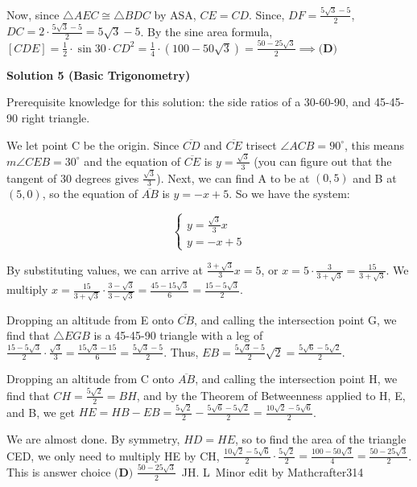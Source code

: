 \begin{enumerate}
 Now, since $\triangle AEC\cong \triangle BDC$ by ASA, $CE=CD$. Since, $DF=\frac{5\sqrt{3}-5}{2}$, $DC=2\cdot \frac{5\sqrt{3}-5}{2}=5\sqrt{3}-5$. By the sine area formula, $[CDE]=\frac{1}{2}\cdot \sin 30\cdot CD^2=\frac{1}{4}\cdot (100-50\sqrt{3})=\frac{50-25\sqrt{3}}{2}\implies \boxed{\textbf{(D)}}$




\textbf{Solution 5 (Basic Trigonometry)}

Prerequisite knowledge for this solution: the side ratios of a 30-60-90, and 45-45-90 right triangle.

 
We let point C be the origin. Since $\overline{CD}$ and $\overline{CE}$ trisect $\angle ACB = 90^{\circ}$, this means $m\angle CEB = 30^{\circ}$ and the equation of $\overline{CE}$ is $y=\frac{\sqrt{3}}{3}$ (you can figure out that the tangent of 30 degrees gives $\frac{\sqrt{3}}{3}$). Next, we can find A to be at $(0, 5)$ and B at $(5, 0)$, so the equation of $\overline{AB}$ is $y=-x+5$. So we have the system:

 
 \[\begin{cases}y=\frac{\sqrt{3}}{3}x\\y=-x+5\end{cases}\]

 By substituting values, we can arrive at $\frac{3+\sqrt{3}}{3}x=5$, or $x=5\cdot\frac{3}{3+\sqrt{3}}=\frac{15}{3+\sqrt{3}}$. We multiply $x=\frac{15}{3+\sqrt{3}}\cdot\frac{3-\sqrt{3}}{3-\sqrt{3}}=\frac{45-15\sqrt{3}}{6}=\frac{15-5\sqrt{3}}{2}$.

 Dropping an altitude from E onto $\overline{CB}$, and calling the intersection point G, we find that $\triangle EGB$ is a 45-45-90 triangle with a leg of $\frac{15-5\sqrt{3}}{2}\cdot\frac{\sqrt{3}}{3}=\frac{15\sqrt{3}-15}{6}=\frac{5\sqrt{3}-5}{2}$. Thus, $EB=\frac{5\sqrt{3}-5}{2}\sqrt{2}=\frac{5\sqrt{6}-5\sqrt{2}}{2}$.

 Dropping an altitude from C onto $\overline{AB}$, and calling the intersection point H, we find that $CH=\frac{5\sqrt{2}}{2}=BH$, and by the Theorem of Betweenness applied to H, E, and B, we get $HE=HB-EB=\frac{5\sqrt{2}}{2}-\frac{5\sqrt{6}-5\sqrt{2}}{2}=\frac{10\sqrt{2}-5\sqrt{6}}{2}$.

 We are almost done. By symmetry, $HD=HE$, so to find the area of the triangle CED, we only need to multiply HE by CH, $\frac{10\sqrt{2}-5\sqrt{6}}{2}\cdot\frac{5\sqrt{2}}{2}=\frac{100-50\sqrt{3}}{4}=\frac{50-25\sqrt{3}}{2}$. This is answer choice $\boxed{\textbf{(D) } \frac{50-25\sqrt{3}}{2}}$~JH. L~Minor edit by Mathcrafter314


\end{enumerate}
